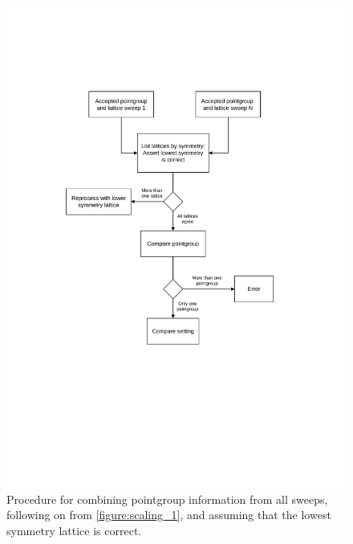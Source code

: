 \documentclass[a4paper, 11pt]{article}
\begin{document}
\begin{figure}
\caption{Procedure for combining pointgroup information from all
  sweeps, following on from \ref{figure:scaling_1}, and assuming that
  the lowest symmetry lattice is correct.
\label{figure:scaling_2}}
\centering
\includegraphics[scale=0.5]{figures/scaling-step-2.pdf}
\end{figure}
\end{document}

